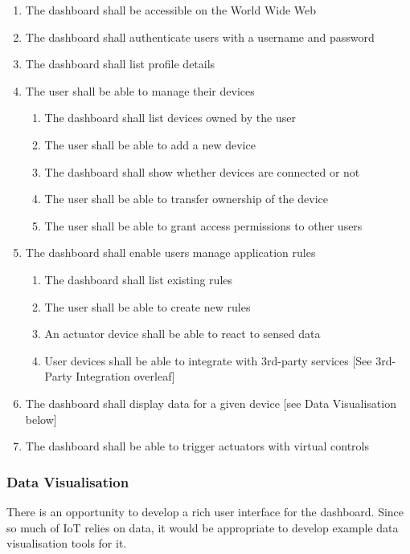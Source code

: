         \begin{enumerate}
          \item The dashboard shall be accessible on the World Wide Web
          \item The dashboard shall authenticate users with a username and password
          \item The dashboard shall list profile details
          \item The user shall be able to manage their devices
          \begin{enumerate}
            \item The dashboard shall list devices owned by the user
            \item The user shall be able to add a new device
            \item The dashboard shall show whether devices are connected or not
            \item The user shall be able to transfer ownership of the device
            \item The user shall be able to grant access permissions to other users
          \end{enumerate}
          \item The dashboard shall enable users manage application rules
          \begin{enumerate}
            \item The dashboard shall list existing rules
            \item The user shall be able to create new rules
            \item An actuator device shall be able to react to sensed data
            \item User devices shall be able to integrate with 3rd-party services [See 3rd-Party Integration overleaf]
          \end{enumerate}
          \item The dashboard shall display data for a given device [see Data Visualisation below]
          \item The dashboard shall be able to trigger actuators with virtual controls
        \end{enumerate}

      \subsubsection{Data Visualisation}
        There is an opportunity to develop a rich user interface for the dashboard. Since so much of IoT relies on data, it would be appropriate to develop example data visualisation tools for it.

